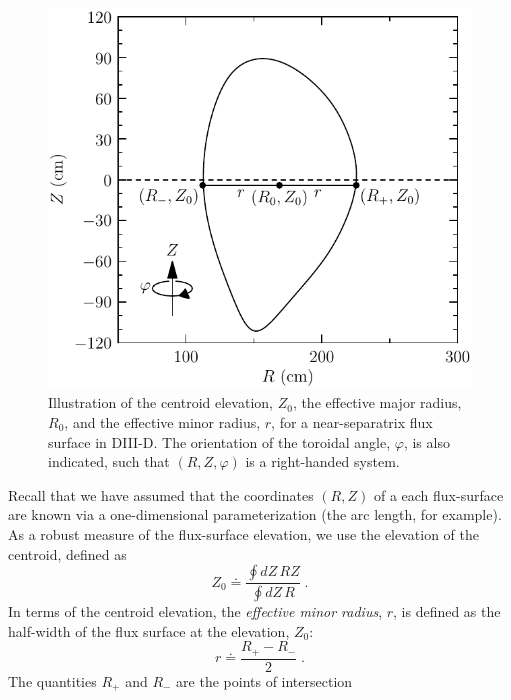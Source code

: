 \begin{figure}
\begin{center}
\includegraphics[scale=0.8]{figures/surf.pdf}
\caption{Illustration of the centroid elevation, $Z_0$, 
the effective major radius, $R_0$, and the effective 
minor radius, $r$, for a near-separatrix flux surface 
in DIII-D.  The 
orientation of the toroidal angle, $\varphi$, is also 
indicated, such that $(R,Z,\varphi)$ is a right-handed 
system.}
\label{fig.surf}
\end{center}
\end{figure}
%
Recall that we have assumed that the coordinates $(R,Z)$ 
of a each flux-surface are known via a one-dimensional 
parameterization (the arc length, for example).  As 
a robust measure of the flux-surface elevation, we 
use the elevation of the centroid, defined as
%
\begin{equation}
Z_0 \doteq 
 \frac{\displaystyle\oint dZ\, R Z}{\displaystyle\oint dZ\, R} \; .
\end{equation}
%
In terms of the centroid elevation, the {\it effective minor 
radius}, $r$, is defined as the half-width of the 
flux surface at the elevation, $Z_0$:
%
\begin{equation}
r \doteq \frac{R_+-R_-}{2} \; .
\label{eq.rmin}
\end{equation}
%
The quantities $R_+$ and $R_-$ are the points of intersection

